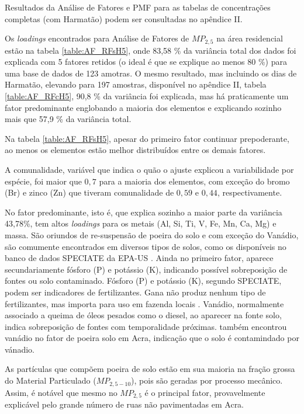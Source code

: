 Resultados da Análise de Fatores e PMF para as tabelas de concentrações 
completas (com Harmatão) podem ser consultadas no apêndice II.

Os \textit{loadings} encontrados para Análise de Fatores de $MP_{2,5}$
na área residencial estão na tabela \ref{table:AF_RFsH5}, onde 83,58 \% 
da variância total dos dados foi explicada com 5 fatores retidos 
(o ideal é que se explique ao menos 80 \%) para uma base de dados de 123 amotras. 
O mesmo resultado, mas incluindo os dias de Harmatão, elevando para 197 amostras, 
disponível no apêndice II, tabela \ref{table:AF_RFcH5}, 90,8 \% da variância
foi explicada, mas há praticamente um fator predominante 
englobando a maioria dos elementos e explicando sozinho mais que 57,9 \% da 
variância total.

Na tabela \ref{table:AF_RFsH5}, apesar do primeiro fator continuar prepoderante,
ao menos os elementos estão melhor distribuídos entre os demais fatores.  

A comunalidade, variável que indica o quão o ajuste explicou a variabilidade por 
espécie, foi maior que $0,7$ para a maioria dos elementos,
com exceção do bromo (Br) e zinco (Zn) que tiveram comunalidade de $0,59$ e 
$0,44$, respectivamente.

No fator predominante, isto é, que explica sozinho a maior parte da variância 
43,78\%, tem altos \textit{loadings} para os metais (Al, Si, Ti, V, Fe, Mn, Ca, 
Mg) e massa. São oriundos de re-suspensão de poeira do solo e com exceção do 
Vanádio, são comumente encontrados em diversos tipos de solos, 
como os disponíveis no banco de dados SPECIATE da EPA-US \citep{simon2010}.
Ainda no primeiro fator, aparece secundariamente fósforo (P) e potássio (K), 
indicando possível sobreposição de fontes ou solo contaminado. 
Fósforo (P) e potássio (K), segundo SPECIATE, podem ser indicadores de 
fertilizantes. Gana não produz nenhum tipo de fertilizantes, mas importa para 
uso em fazenda locais \citep{fianko2011}. 
Vanádio, normalmente associado a queima de óleos pesados como o diesel, ao 
aparecer na fonte solo, indica sobreposição de fontes com temporalidade próximas.
\citet{aboh2009} também encontrou vanádio no fator de poeira solo em Acra, 
indicação que o solo é contamindado por vánadio.

As partículas que compõem poeira de solo estão em sua maioria na fração
grossa do Material Particulado ($MP_{2,5-10}$), pois são geradas por processo 
mecânico. Assim, é notável que mesmo no $MP_{2,5}$ é o principal fator, 
provavelmente explicável pelo grande número de ruas não pavimentadas em Acra. 

